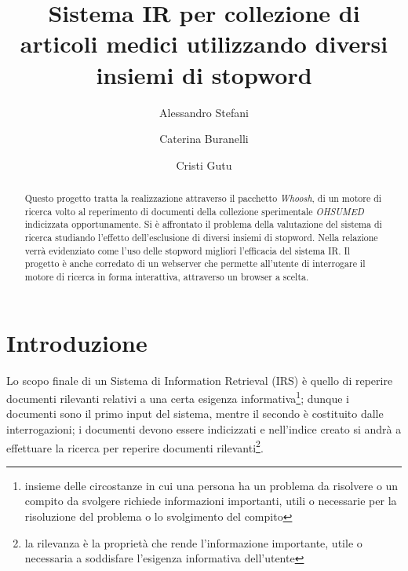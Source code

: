 \documentclass[runningheads]{llncs}
\begin{document}
%
\title{Sistema IR per collezione di articoli medici utilizzando diversi insiemi di stopword}
%
%
\author{%
  Alessandro Stefani \and
  Caterina Buranelli \and
  Cristi Gutu}
%
%
%
\maketitle
%
\begin{abstract}
Questo progetto tratta la realizzazione attraverso il pacchetto \emph{Whoosh}, di un motore di ricerca
volto al reperimento di documenti della collezione sperimentale \emph{OHSUMED} indicizzata opportunamente.
Si \`e affrontato il problema della valutazione del sistema di ricerca studiando l'effetto dell'esclusione
di diversi insiemi di stopword. Nella relazione verr\`a evidenziato come l'uso delle stopword migliori l'efficacia
del sistema IR.
Il progetto \`e anche corredato di un webserver che permette all'utente di interrogare il motore di ricerca
in forma interattiva, attraverso un browser a scelta.
\end{abstract}

\section{Introduzione}
\label{sec:introduzione}

Lo scopo finale di un Sistema di Information Retrieval (IRS) \`e quello di reperire documenti
 rilevanti relativi a una certa esigenza informativa\footnote{insieme delle circostanze in cui una
 persona ha un problema da risolvere o un compito da svolgere richiede informazioni
 importanti, utili o necessarie per la risoluzione del problema o lo svolgimento del compito};
  dunque i documenti sono il primo input del sistema, mentre il secondo \`e
  costituito dalle interrogazioni; i documenti devono essere
  indicizzati e nell'indice creato si andr\`a a effettuare la ricerca per reperire documenti rilevanti\footnote{la rilevanza \`e la propriet\`a che rende l'informazione importante, utile o necessaria a soddisfare l'esigenza informativa dell'utente}. 
  
\end{document}
